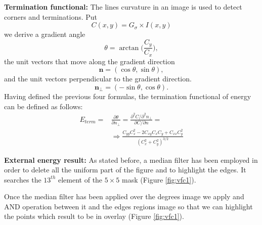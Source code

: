 \documentclass[final,a4paper,12pt,english]{UnicaPhdThesis3}
\begin{document}
	\textbf{Termination functional:} The lines curvature in an image is used to detect corners and terminations. Put
	\begin{equation}
	C(x,y)=G_{{\sigma }} \times I(x,y)
	\end{equation}
	we derive a gradient angle
	\begin{equation}
	\theta =\arctan {\Bigg (}{\frac  {C_{y}}{C_{x}}}{\Bigg )},
	\end{equation}
	the unit vectors that move along the gradient direction 
	\begin{equation}
	{\mathbf  n}=(\cos \theta ,\sin \theta ),
	\end{equation}
	and the unit vectors perpendicular to the gradient direction.
	\begin{equation}
	{\mathbf  n}_{{\perp }}=(-\sin \theta ,\cos \theta ).
	\end{equation}
	Having defined the previous four formulas, the termination functional of energy can be defined as follows:
	\begin{equation}
	\begin{split}
	E_{{term}}=&{\frac{\partial \theta}{\partial n_{{\perp }}}}={ \frac{\partial ^{2}C/\partial ^{2}n_{{\perp }}}{\partial C/\partial n}}= \\ & %
	\Rightarrow {\frac{C_{{yy}}C_{x}^{2}-2C_{{xy}}C_{x}C_{y}+C_{{xx}}C_{y}^{2}}{(C_{x}^{2}+C_{y}^{2})^{{3/2}}}}
	\end{split}
	\end{equation}
	
	\textbf{External energy result:}  As stated before, a median filter has been employed in order to delete all the uniform part of the figure and to highlight the edges. It searches the $13^{th}$ element of the $5 \times 5$ mask (Figure \ref{fig:vfc1}). 
	
	Once the median filter has been applied over the degrees image we apply and AND operation between it and the edges regions image so that we can highlight the points which result to be in overlay (Figure \ref{fig:vfc1}).
	
\end{document}
